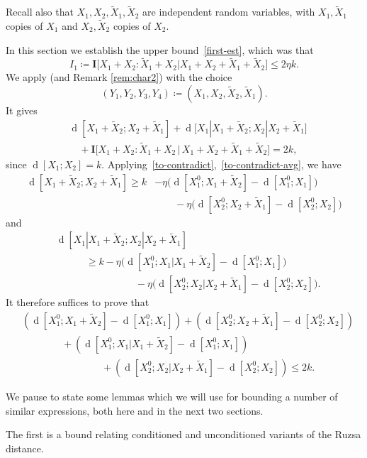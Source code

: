 \documentclass[12pt,reqno,tbtags]{amsart}
\theoremstyle{definition}
\theoremstyle{remark}
\renewcommand{\leq}{\leqslant}
\renewcommand{\geq}{\geqslant}
\newcommand{\bigI}[1]{\mathbf{I}\big[#1\big]}
\newcommand{\dist}[2]{{\operatorname{d}[#1;#2]}} %
\newcommand{\costa}[1]{\eta\bigl(\dist{X_1^0}{#1} - \dist{X_1^0}{X_1}\bigr)} %
\newcommand{\costb}[1]{\eta\bigl(\dist{X_2^0}{#1} - \dist{X_2^0}{X_2}\bigr)} %
\newcommand{\bigdist}[2]{{\operatorname{d}\bigl[#1;#2\bigr]}} %
\numberwithin{equation}{section}
\begin{document}
Recall also that $X_1, X_2, \tilde X_1, \tilde X_2$ are independent random variables, with $X_1,\tilde X_1$ copies of $X_1$ and $X_2,\tilde X_2$ copies of $X_2$.

In this section we establish the upper bound~\eqref{first-est}, which was that
\[
  I_1 \coloneqq \bigI{ X_1+X_2 : \tilde X_1 + X_2 | X_1+X_2+\tilde X_1+\tilde X_2 } \leq 2 \eta k.
\]
We apply  (and Remark \ref{rem:char2}) with the choice
\[
  (Y_1,Y_2,Y_3,Y_4) \coloneqq (X_1, X_2, \tilde X_2, \tilde X_1).
\]
It gives
\begin{align}
  \nonumber
&\dist{X_1+\tilde X_2}{X_2+\tilde X_1} + \bigdist{X_1|X_1+\tilde X_2}{X_2|X_2+\tilde X_1} \\
\label{second-main}
&\quad + \bigI{ X_1+ X_2 : \tilde X_1 + X_2 \,|\, X_1 + X_2 + \tilde X_1 + \tilde X_2 } = 2k,
\end{align}
since $\dist{X_1}{X_2} = k$.
Applying~\eqref{to-contradict},~\eqref{to-contradict-avg}, we have
\begin{align*}
  \dist{X_1+\tilde X_2}{X_2+\tilde X_1} \geq k &- \costa{X_1+\tilde X_2} \\& \qquad- \costb{X_2+\tilde X_1}
\end{align*}
and
\begin{align}
  \nonumber
  & \dist{X_1|X_1+\tilde X_2}{X_2|X_2+\tilde X_1}  \\ \nonumber & \qquad\quad \geq k - \costa{X_1 | X_1 + \tilde X_2} \\
  & \qquad\qquad\qquad\qquad  - \costb{X_2 | X_2 + \tilde X_1}.
   \label{second-tc2}
\end{align}
It therefore suffices to prove that
\begin{align}
\nonumber
&(\dist{X_1^0}{X_1+\tilde X_2}-\dist{X_1^0}{X_1})+ (\dist{X_2^0}{X_2+\tilde X_1}-\dist{X_2^0}{X_2})\\
&\qquad \qquad +(\dist{X_1^0}{X_1|X_1+\tilde X_2}-\dist{X_1^0}{X_1}) \nonumber \\ & \qquad \qquad \qquad \qquad  +(\dist{X_2^0}{X_2|X_2+\tilde X_1}-\dist{X_2^0}{X_2}) \leq 2k.
\label{suff-for-first-est}
\end{align}


We pause to state some lemmas which we will use for bounding a number of similar expressions, both here and in the next two sections.

The first is a bound relating conditioned and unconditioned variants of the Ruzsa distance.
\end{document}
